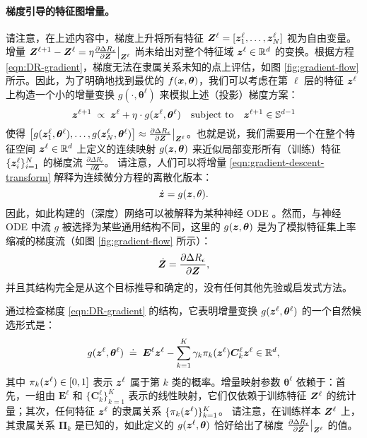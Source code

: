 \documentclass[../../book-main_zh.tex]{subfiles}
\begin{document}
\paragraph{梯度引导的特征图增量。} 请注意，在上述内容中，梯度上升将所有特征 $\bm{Z}^{\ell} = [\bm{z}^{\ell}_{1}, \dots, \bm{z}^{\ell}_{N}]$ 视为自由变量。增量 $\bm{Z}^{\ell+1} - \bm{Z}^{\ell} = \eta \frac{\partial \Delta R_{\epsilon}}{\partial \bm Z}\big|_{\bm{Z}^\ell}$ 尚未给出对整个特征域 $\bm{z}^\ell \in \mathbb{R}^d$ 的变换。根据方程 \eqref{eqn:DR-gradient}，梯度无法在隶属关系未知的点上评估，如图 \ref{fig:gradient-flow} 所示。因此，为了明确地找到最优的 $f(\bm{x},\bm  \theta)$，我们可以考虑在第 $\ell$ 层的特征 $\bm{z}^\ell$ 上构造一个小的增量变换 $g(\cdot, \bm{\theta}^{\ell})$ 来模拟上述（投影）梯度方案：
\begin{equation}
\bm{z}^{\ell + 1}   \; \propto \; \bm{z}^{\ell} + \eta\cdot  g(\bm{z}^{\ell}, \bm{\theta}^{\ell}) \quad \mbox{subject to} \quad \bm{z}^{\ell +1} \in \mathbb{S}^{d-1}
\label{eqn:gradient-descent-transform}
\end{equation}
使得 $\big[g(\bm{z}_1^{\ell}, \bm \theta^{\ell}), \ldots, g(\bm{z}_N^{\ell}, \bm \theta^{\ell}) \big] \approx \frac{\partial \Delta R_{\epsilon}}{\partial \bm Z}\big|_{\bm{Z}^\ell}$。也就是说，我们需要用一个在整个特征空间 $\bm{z}^\ell \in \mathbb{R}^d$ 上定义的连续映射 $g(\bm{z},\bm \theta)$ 来近似局部变形所有（训练）特征 $\{\bm{z}_i^\ell\}_{i=1}^N$ 的梯度流 $\frac{\partial \Delta R_{\epsilon}}{\partial \bm Z}$。
请注意，人们可以将增量 \eqref{eqn:gradient-descent-transform} 解释为连续微分方程的离散化版本：
\begin{equation}
\dot{\bm{z}} = g(\bm{z}, \theta).
\end{equation}
因此，如此构建的（深度）网络可以被解释为某种神经 ODE \cite{chen2018neural}。然而，与神经 ODE 中流 $g$ 被选择为某些通用结构不同，这里的 $g(\bm{z}, \bm\theta)$ 是为了模拟特征集上率缩减的梯度流（如图 \ref{fig:gradient-flow} 所示）：
\begin{equation*}
    \dot{\bm{Z}} = \frac{\partial \Delta R_{\epsilon}}{\partial \bm Z},
\end{equation*}
并且其结构完全是从这个目标推导和确定的，没有任何其他先验或启发式方法。

通过检查梯度 \eqref{eqn:DR-gradient} 的结构，它表明增量变换 $g(\bm{z}^\ell, \bm \theta^\ell)$ 的一个自然候选形式是：
\begin{equation}
    g(\bm{z}^\ell, \bm \theta^\ell) \; \doteq \; \bm E^\ell \bm{z}^\ell - \sum_{k=1}^K \gamma_{k} \pi_k(\bm{z}^\ell)\bm C_{k}^{\ell}  \bm{z}^{\ell}  \in \mathbb{R}^d,
    \label{eqn:DR-gradient-transform}
\end{equation}
其中 $\pi_k(\bm{z}^\ell) \in [0,1]$ 表示 $\bm{z}^{\ell}$ 属于第 $k$ 类的概率。增量映射参数 $\bm \theta^\ell$ 依赖于：首先，一组由 $\bm E^{\ell}$ 和 $\{ \bm C^{\ell}_{k}\}_{k=1}^{K}$ 表示的线性映射，它们仅依赖于训练特征 $\bm{Z}^\ell$ 的统计量；其次，任何特征 $\bm{z}^\ell$ 的隶属关系 $\{ \pi_k(\bm{z}^\ell)\}_{k=1}^K$。
请注意，在训练样本 $\bm{Z}^\ell$ 上，其隶属关系 $\bm \Pi_k$ 是已知的，如此定义的 $g(\bm{z}^\ell, \bm \theta)$ 恰好给出了梯度 $\frac{\partial \Delta R_{\epsilon}}{\partial \bm Z}\big|_{\bm{Z}^\ell}$ 的值。
\end{document}
